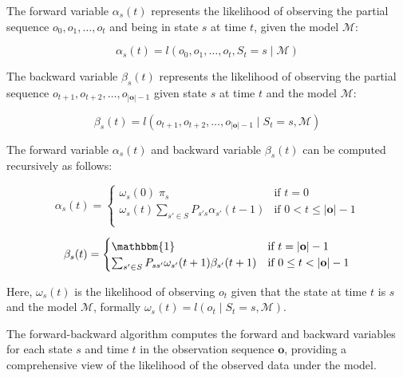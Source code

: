 The forward variable $\alpha_s(t)$ represents the likelihood of observing the partial sequence $o_0, o_1, \dots, o_t$ and being in state $s$ at time $t$, given the model $\mathcal{M}$:


\begin{equation}
    \alpha_s(t) = l(o_0, o_1, \dots, o_t, S_{t} = s \mid \mathcal{M})
    \label{eq:alpha-recursive}
\end{equation}


The backward variable $\beta_s(t)$ represents the likelihood of observing the partial sequence $o_{t+1}, o_{t+2}, \dots, o_{|\mathbf{o}|-1}$ given state $s$ at time $t$ and the model $\mathcal{M}$:


\begin{equation}
    \beta_s(t) = l(o_{t+1}, o_{t+2}, \dots, o_{|\mathbf{o}|-1} \mid S_{t} = s, \mathcal{M})
    \label{eq:beta-recursive}
\end{equation}


The forward variable $\alpha_s(t)$ and backward variable $\beta_s(t)$ can be computed recursively as follows:


\begin{equation}
    \alpha_s(t) =
    \begin{cases}
        \omega_s(0) \; \pi_s & \text{if } t = 0 \\
        \omega_s(t) \sum_{s' \in S} P_{s's}\alpha_{s'}(t - 1) & \text{if } 0 < t \leq |\mathbf{o}| - 1 \\
    \end{cases}
    \label{eq:forward-recursive}
\end{equation}


\begin{equation}
    \beta_s(t) =
    \begin{cases}
        \mathbbm{1} & \text{if } t = |\mathbf{o}| - 1 \\
        \sum_{s' \in S} P_{ss'} \omega_{s'}(t + 1) \beta_{s'}(t + 1) & \text{if } 0 \leq t < |\mathbf{o}| - 1 \\
    \end{cases}
    \label{eq:backward-recursive}
\end{equation}


Here, $\omega_{s}(t)$ is the likelihood of observing $o_t$ given that the state at time $t$ is $s$ and the model $\mathcal{M}$, formally $\omega_s(t) = l(o_t \mid S_t = s, \mathcal{M})$.

The forward-backward algorithm computes the forward and backward variables for each state $s$ and time $t$ in the observation sequence $\mathbf{o}$, providing a comprehensive view of the likelihood of the observed data under the model.

